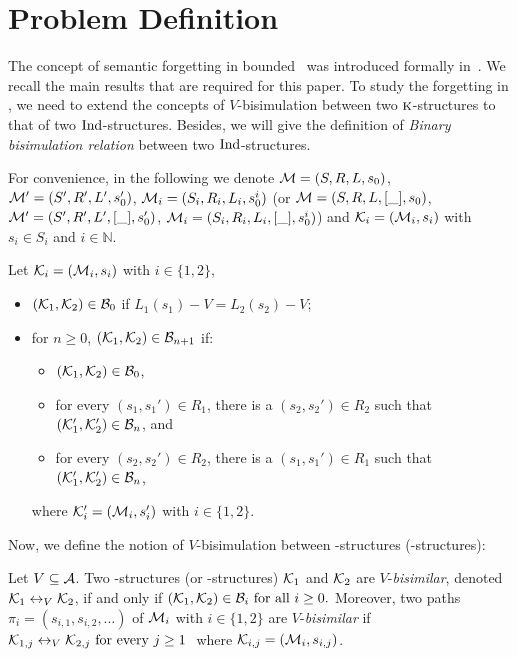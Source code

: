 \documentclass[letterpaper]{article}
\begin{document}
\section{Problem Definition}
The concept of semantic forgetting in bounded \CTL\ was introduced formally in~\cite{renyansfirstpaper}. We recall the main results that are required for this paper. 
To study the forgetting in \CTL, we need to extend the concepts of $V$-bisimulation between two $\textsc{k}$-structures to that of two $\textrm{Ind}$-structures. 
Besides, we will give the definition of  \emph{Binary  bisimulation  relation} between two $\textrm{Ind}$-structures. 

For convenience, in the following we denote ${\cal M}=(S, R, L, s_0)$,
${\cal M}'=(S',R',L',s_0')$, ${\cal M}_i=(S_i, R_i,L_i, s_0^i)$ (or ${\cal M}=(S, R, L, [\_], s_0)$,
${\cal M}'=(S',R',L', [\_],s_0')$, ${\cal M}_i=(S_i, R_i,L_i, [\_], s_0^i)$) and ${\cal K}_i=({\cal M}_i, s_i)$ with $s_i \in S_i$
and $i \in \mathbb{N}$.

Let
${\cal K}_i=({\cal M}_i,s_i)$ with $i\in\{1,2\}$,
\begin{itemize}
  \item $({\cal K}_1,{\cal K}_2)\in{\cal B}_0$ if $L_1(s_1)- V=L_2(s_2)- V$;  %
  \item for $n\ge 0$, $({\cal K}_1,{\cal K}_2)\in{\cal B}_{n+1}$ if:
  \begin{itemize}
    \item $({\cal K}_1,{\cal K}_2)\in{\cal B}_0$,
    \item for every $(s_1,s_1')\in R_1$, there is a $(s_2,s_2')\in R_2$
    such that $({\cal K}_1',{\cal K}_2')\in {\cal B}_n$, and
    \item for every $(s_2,s_2')\in R_2$, there is a $(s_1,s_1')\in R_1$
    such that $({\cal K}_1',{\cal K}_2')\in {\cal B}_n$,
  \end{itemize}
  where ${\cal K}_i'=({\cal M}_i,s_i')$ with $i\in\{1,2\}$.
\end{itemize}

Now, we define the notion of $V$-bisimulation between \MPK-structures (\Ind-structures):
\begin{definition}[$V$-bisimulation] %
  \label{def:V-bisimulation}
   Let $V\subseteq\cal A$. Two \MPK-structures (or \Ind-structures) ${\cal K}_1$ and ${\cal K}_2$ are $V$-{\em bisimilar},  denoted ${\cal K}_1 \leftrightarrow_V {\cal K}_2$, 
 if and only if $({\cal K}_1,{\cal K}_2)\in {{\cal B}_i}\mbox{ for all }i\ge 0.$ Moreover, two paths $\pi_i=(s_{i,1},s_{i,2},\ldots)$ of ${\cal M}_i$ with $i\in \{1,2\}$
 are $V$-{\em bisimilar} if
$ {\cal K}_{1,j} \leftrightarrow_V {\cal K}_{2,j}\mbox { for every $j\ge 1$ }$
 where ${\cal K}_{i,j}=({\cal M}_i,s_{i,j})$.
\end{definition}
\end{document}
